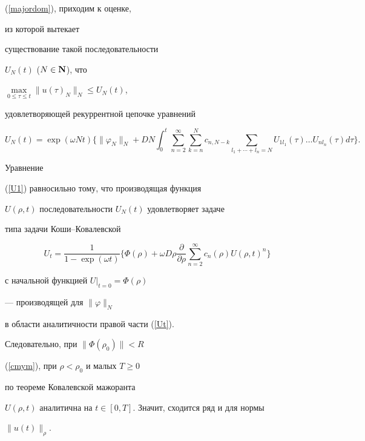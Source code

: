 \begin{pf}
(\ref{majordom}), приходим к оценке,


из которой вытекает


существование такой последовательности


$U_N(t)$ ($N\in{\bold{N}}$), что


$\max\limits_{0\leq\tau\leq{t}}\|u(\tau)_N\|_N\leq U_N(t)$,


удовлетворяющей рекуррентной цепочке уравнений


\begin{equation}


\label{U1}


U_N(t)=


\exp(\omega Nt)


\bigg\{\|\varphi_{N}\|_{N}+


DN


\int_{0}^{ t }


\sum\limits_{n=2}^{\infty}


\sum\limits_{k=n}^{N}c_{n,N-k}\sum\limits_{l_1+\dotsb+l_n=N}


U_{1l_1}(\tau)\dotsc U_{nl_n}(\tau) d\tau\bigg\}.


\end{equation}


Уравнение


(\ref{U1}) равносильно тому, что производящая функция


$U(\rho,t)$ последовательности $U_N(t)$ удовлетворяет задаче


типа задачи Коши--Ковалевской


\begin{equation}


\label{Ut}


U_t=\frac{1}{1-\exp(\omega t)}


\bigg\{


\Phi(\rho)+\omega D \rho\frac{\partial }{\partial\rho }


\sum\limits_{n=2}^{\infty}


c_n(\rho) U(\rho,t)^n


\bigg\}


\end{equation}


с начальной функцией $U|_{t=0}=\Phi(\rho)$


--- производящей для $\|\varphi\|_N$


в области аналитичности правой части (\ref{Ut}).


Следовательно, при $\|\Phi(\rho_0)\|<R$


(\ref{cmym}), при $\rho<\rho_0$ и малых $T\geq0$


по теореме Ковалевской мажоранта


$U(\rho,t)$ аналитична на $t\in[0,T]$. Значит, сходится ряд и для нормы


$\|u(t)\|_\rho$.


\end{pf}





